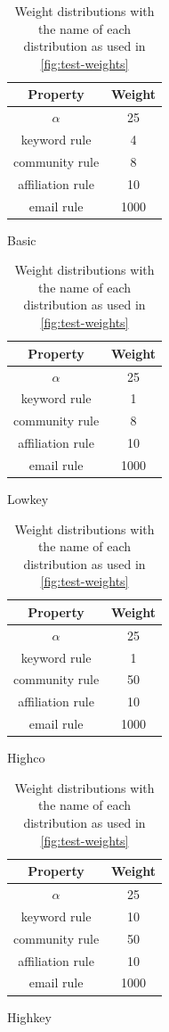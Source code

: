 \begin{table}[ht]
	\begin{minipage}[b]{0.5\linewidth}\centering
		\begin{tabular}{|c|c|}
			\hline
			\bfseries{Property} & \bfseries{Weight} \\
			\hline
			$\alpha$ & 25 \\
			\hline
			keyword rule & 4\\
			\hline
			community rule & 8\\
			\hline
			affiliation rule & 10\\
			\hline
			email rule & 1000\\
			\hline
		\end{tabular}
		\caption{Basic}
	\end{minipage}
	\begin{minipage}[b]{0.5\linewidth}
		\centering
		\begin{tabular}{|c|c|}
			\hline
			\bfseries{Property} & \bfseries{Weight} \\
			\hline
			$\alpha$ & 25 \\
			\hline
			keyword rule & 1\\
			\hline
			community rule & 8\\
			\hline
			affiliation rule & 10\\
			\hline
			email rule & 1000\\
			\hline
		\end{tabular}
		\caption{Lowkey}
	\end{minipage}
	\begin{minipage}[b]{0.5\linewidth}\centering
		\begin{tabular}{|c|c|}
			\hline
			\bfseries{Property} & \bfseries{Weight} \\
			\hline
			$\alpha$ & 25 \\
			\hline
			keyword rule & 1\\
			\hline
			community rule & 50\\
			\hline
			affiliation rule & 10\\
			\hline
			email rule & 1000\\
			\hline
		\end{tabular}
		\caption{Highco}
	\end{minipage}
	\begin{minipage}[b]{0.5\linewidth}
		\centering
		\begin{tabular}{|c|c|}
			\hline
			\bfseries{Property} & \bfseries{Weight} \\
			\hline
			$\alpha$ & 25 \\
			\hline
			keyword rule & 10\\
			\hline
			community rule & 50\\
			\hline
			affiliation rule & 10\\
			\hline
			email rule & 1000\\
			\hline
		\end{tabular}
		\caption{Highkey}
		\label{table:highkey}
	\end{minipage}
	\caption{Weight distributions with the name of each distribution as used in \autoref{fig:test-weights}}
	\label{table:distributions}
\end{table}


